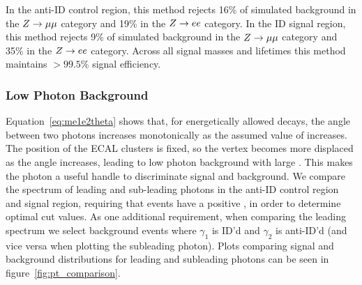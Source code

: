 In the anti-ID control region, this method rejects 16\% of simulated background in the $Z\to \mu\mu$ category and 19\% in the $Z\to ee$ category. In the ID signal region, this method rejects 9\% of simulated background in the $Z\to\mu\mu$ category and 35\% in the $Z\to ee$ category. Across all signal masses and lifetimes this method maintains $>99.5\%$ signal efficiency.

\subsubsection{Low \pt Photon Background} \label{sec:ana_photonpt}
Equation~\ref{eq:me1e2theta} shows that, for energetically allowed decays, the angle between two photons increases monotonically as the assumed value of \mphi increases. The position of the ECAL clusters is fixed, so the vertex becomes more displaced as the angle increases, leading to low \pt photon background with large \lxy. This makes the photon \pt a useful handle to discriminate signal and background. We compare the \pt spectrum of leading and sub-leading photons in the anti-ID control region and signal region, requiring that events have a positive \lxy, in order to determine optimal cut values. As one additional requirement, when comparing the leading \pt spectrum we select background events where $\gamma_1$ is ID'd and $\gamma_2$ is anti-ID'd (and vice versa when plotting the subleading photon). Plots comparing signal and background \pt distributions for leading and subleading photons can be seen in figure~\ref{fig:pt_comparison}.

